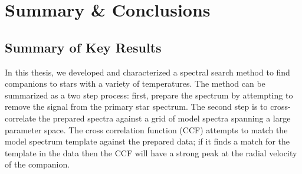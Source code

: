 \documentclass{utthesis}
\begin{document}





















\chapter{Summary \& Conclusions}
\label{chap:conclusions}

\section{Summary of Key Results}

In this thesis, we developed and characterized a spectral search method to find companions to stars with a variety of temperatures. The method can be summarized as a two step process: first, prepare the spectrum by attempting to remove the signal from the primary star spectrum. The second step is to cross-correlate the prepared spectra against a grid of model spectra spanning a large parameter space. The cross correlation function (CCF) attempts to match the model spectrum template against the prepared data; if it finds a match for the template in the data then the CCF will have a strong peak at the radial velocity of the companion.
\end{document}
